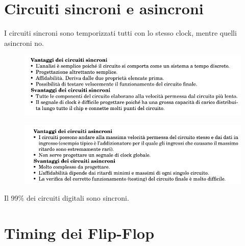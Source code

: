 \documentclass{book}
\begin{document}
    \section{Circuiti sincroni e asincroni}
        I circuiti sincroni sono temporizzati tutti con lo stesso clock, mentre quelli asincroni no.
        \begin{figure}[h!]
            \centering
            \includegraphics[width=0.75\linewidth]{img/chapt12img1.png}
        \end{figure}
        \begin{figure}[h!]
            \centering
            \includegraphics[width=0.75\linewidth]{img/chap12img2.png}
        \end{figure}
        Il 99\% dei circuiti digitali sono sincroni.
    \section{Timing dei Flip-Flop}
        
\end{document}
